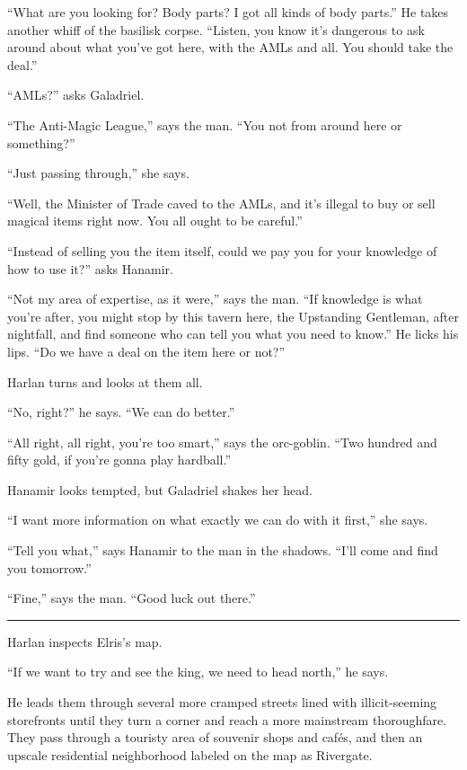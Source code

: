 \documentclass[smalldemyvopaper,11pt,twoside,onecolumn,openright,extrafontsizes]{memoir}
\begin{document}
``What are you looking for? Body parts? I got all kinds of body parts.''
He takes another whiff of the basilisk corpse. ``Listen, you know it's
dangerous to ask around about what you've got here, with the AMLs and
all. You should take the deal.''

``AMLs?'' asks Galadriel.

``The Anti-Magic League,'' says the man. ``You not from around here or
something?''

``Just passing through,'' she says.

``Well, the Minister of Trade caved to the AMLs, and it's illegal to buy
or sell magical items right now. You all ought to be careful.''

``Instead of selling you the item itself, could we pay you for your
knowledge of how to use it?'' asks Hanamir.

``Not my area of expertise, as it were,'' says the man. ``If knowledge
is what you're after, you might stop by this tavern here, the Upstanding
Gentleman, after nightfall, and find someone who can tell you what you
need to know.'' He licks his lips. ``Do we have a deal on the item here
or not?''

Harlan turns and looks at them all.

``No, right?'' he says. ``We can do better.''

``All right, all right, you're too smart,'' says the orc-goblin. ``Two
hundred and fifty gold, if you're gonna play hardball.''

Hanamir looks tempted, but Galadriel shakes her head.

``I want more information on what exactly we can do with it first,'' she
says.

``Tell you what,'' says Hanamir to the man in the shadows. ``I'll come
and find you tomorrow.''

``Fine,'' says the man. ``Good luck out there.''

\begin{center}\rule{0.5\linewidth}{\linethickness}\end{center}

Harlan inspects Elris's map.

``If we want to try and see the king, we need to head north,'' he says.

He leads them through several more cramped streets lined with
illicit-seeming storefronts until they turn a corner and reach a more
mainstream thoroughfare. They pass through a touristy area of souvenir
shops and cafés, and then an upscale residential neighborhood labeled on
the map as Rivergate.
\end{document}
